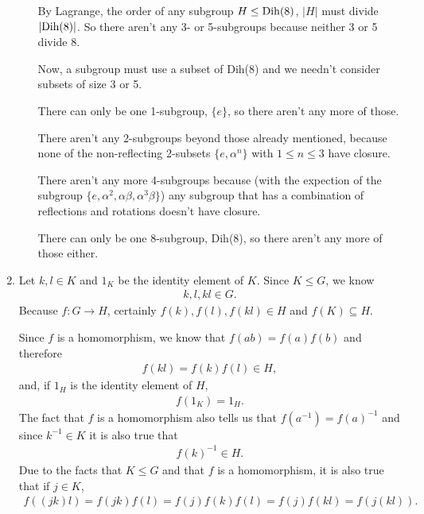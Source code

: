 \documentclass[10pt]{article}
\begin{document}
\begin{enumerate}
\begin{enumerate}
        By Lagrange, the order of any subgroup $H \leq {\rm Dih}(8)$, $|H|$
        must divide $|{\rm Dih}(8)|$. So there aren't any 3- or 5-subgroups
        because neither 3 or 5 divide 8.

        Now, a subgroup must use a subset of Dih(8) and we needn't consider
        subsets of size 3 or 5.

        There can only be one 1-subgroup, $\{e\}$, so there aren't any more of
        those.

        There aren't any 2-subgroups beyond those already mentioned, because
        none of the non-reflecting 2-subsets $\{e, \alpha^n\}$ with $1 \leq n
        \leq 3$ have closure.

        There aren't any more 4-subgroups because (with the expection of the
        subgroup $\{e, \alpha^2, \alpha\beta, \alpha^3\beta\}$) any subgroup
        that has a combination of reflections and rotations doesn't have
        closure.

        There can only be one 8-subgroup, Dih(8), so there aren't any more of
        those either.
    \end{enumerate}
  \item Let $k, l \in K$ and $1_K$ be the identity element of $K$.
    Since $K \leq G$, we know
    \begin{align*}
      k, l, kl \in G.
    \end{align*}
    Because $f : G \rightarrow H$, certainly 
      $f(k), f(l), f(kl) \in H$ and $f(K) \subseteq H$.

    Since $f$ is a homomorphism, we know that $f(ab) = f(a)f(b)$ and therefore
    \begin{align}
      f(kl) = f(k)f(l) \in H,
    \end{align}
    and, if $1_H$ is the identity element of $H$,
    \begin{align}
      f(1_K) = 1_H.
    \end{align}
          The fact that $f$ is a homomorphism also tells us that $f(a^{-1}) =
          f(a)^{-1}$ and since $k^{-1} \in K$ it is also true that
    \begin{align}
      f(k)^{-1} \in H.
    \end{align}
    Due to the facts that $K \leq G$ and that $f$ is a homomorphism, it is also
    true that if $j \in K$,
      \begin{align}
        f((jk)l) = f(jk)f(l) = f(j)f(k)f(l) = f(j)f(kl) = f(j(kl)).
      \end{align}


\end{enumerate}
\end{document}
